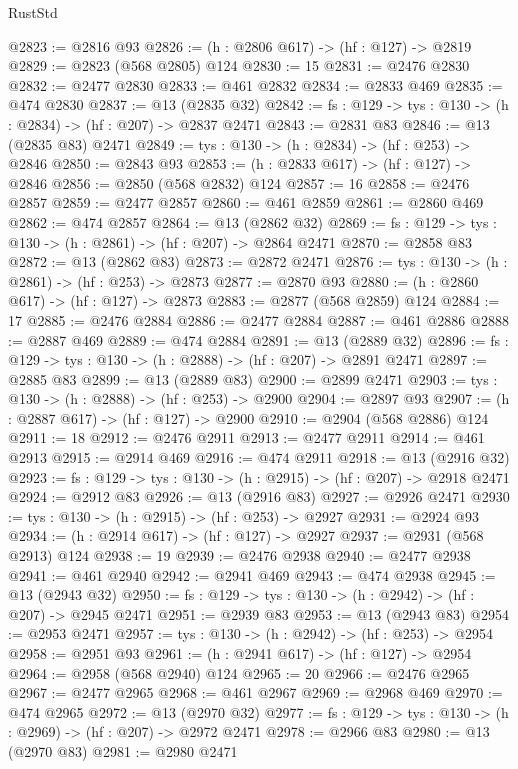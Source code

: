 \begin{lexlean}{RustStd}
\begin{coremodule}
{\begin{coremodule}
{{{{{{{{{{{{{{{@2823 := @2816 @93
@2826 := (h : @2806 @617) -> (hf : @127) -> @2819
@2829 := @2823 (@568 @2805) @124
@2830 := 15
@2831 := @2476 @2830
@2832 := @2477 @2830
@2833 := @461 @2832
@2834 := @2833 @469
@2835 := @474 @2830
@2837 := @13 (@2835 @32)
@2842 := {fs : @129} -> {tys : @130} -> (h : @2834) -> (hf : @207) -> @2837 @2471
@2843 := @2831 @83
@2846 := @13 (@2835 @83) @2471
@2849 := {tys : @130} -> (h : @2834) -> (hf : @253) -> @2846
@2850 := @2843 @93
@2853 := (h : @2833 @617) -> (hf : @127) -> @2846
@2856 := @2850 (@568 @2832) @124
@2857 := 16
@2858 := @2476 @2857
@2859 := @2477 @2857
@2860 := @461 @2859
@2861 := @2860 @469
@2862 := @474 @2857
@2864 := @13 (@2862 @32)
@2869 := {fs : @129} -> {tys : @130} -> (h : @2861) -> (hf : @207) -> @2864 @2471
@2870 := @2858 @83
@2872 := @13 (@2862 @83)
@2873 := @2872 @2471
@2876 := {tys : @130} -> (h : @2861) -> (hf : @253) -> @2873
@2877 := @2870 @93
@2880 := (h : @2860 @617) -> (hf : @127) -> @2873
@2883 := @2877 (@568 @2859) @124
@2884 := 17
@2885 := @2476 @2884
@2886 := @2477 @2884
@2887 := @461 @2886
@2888 := @2887 @469
@2889 := @474 @2884
@2891 := @13 (@2889 @32)
@2896 := {fs : @129} -> {tys : @130} -> (h : @2888) -> (hf : @207) -> @2891 @2471
@2897 := @2885 @83
@2899 := @13 (@2889 @83)
@2900 := @2899 @2471
@2903 := {tys : @130} -> (h : @2888) -> (hf : @253) -> @2900
@2904 := @2897 @93
@2907 := (h : @2887 @617) -> (hf : @127) -> @2900
@2910 := @2904 (@568 @2886) @124
@2911 := 18
@2912 := @2476 @2911
@2913 := @2477 @2911
@2914 := @461 @2913
@2915 := @2914 @469
@2916 := @474 @2911
@2918 := @13 (@2916 @32)
@2923 := {fs : @129} -> {tys : @130} -> (h : @2915) -> (hf : @207) -> @2918 @2471
@2924 := @2912 @83
@2926 := @13 (@2916 @83)
@2927 := @2926 @2471
@2930 := {tys : @130} -> (h : @2915) -> (hf : @253) -> @2927
@2931 := @2924 @93
@2934 := (h : @2914 @617) -> (hf : @127) -> @2927
@2937 := @2931 (@568 @2913) @124
@2938 := 19
@2939 := @2476 @2938
@2940 := @2477 @2938
@2941 := @461 @2940
@2942 := @2941 @469
@2943 := @474 @2938
@2945 := @13 (@2943 @32)
@2950 := {fs : @129} -> {tys : @130} -> (h : @2942) -> (hf : @207) -> @2945 @2471
@2951 := @2939 @83
@2953 := @13 (@2943 @83)
@2954 := @2953 @2471
@2957 := {tys : @130} -> (h : @2942) -> (hf : @253) -> @2954
@2958 := @2951 @93
@2961 := (h : @2941 @617) -> (hf : @127) -> @2954
@2964 := @2958 (@568 @2940) @124
@2965 := 20
@2966 := @2476 @2965
@2967 := @2477 @2965
@2968 := @461 @2967
@2969 := @2968 @469
@2970 := @474 @2965
@2972 := @13 (@2970 @32)
@2977 := {fs : @129} -> {tys : @130} -> (h : @2969) -> (hf : @207) -> @2972 @2471
@2978 := @2966 @83
@2980 := @13 (@2970 @83)
@2981 := @2980 @2471
}}}}}}}}}}}}}}}
\end{coremodule}}
\end{coremodule}
\end{lexlean}
